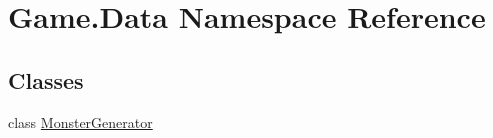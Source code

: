 \hypertarget{namespace_game_1_1_data}{}\section{Game.\+Data Namespace Reference}
\label{namespace_game_1_1_data}
\subsection*{Classes}
\begin{DoxyCompactItemize}
\item 
class \mbox{\hyperlink{class_game_1_1_data_1_1_monster_generator}{Monster\+Generator}}
\end{DoxyCompactItemize}

